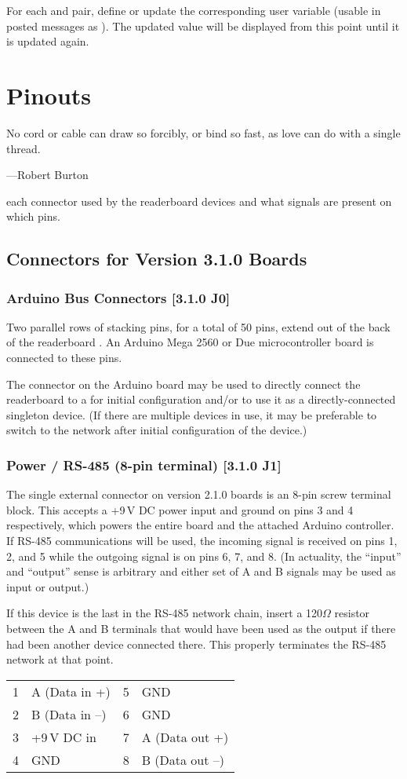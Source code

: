 For each  and  pair, define or update the corresponding
user variable (usable in posted messages as \z{\{\$}\z{\}}). The
updated value will be displayed from this point until it is updated again.

\chapter{Pinouts}
\epigraph{No cord or cable can draw so forcibly, or bind so fast, as love can do with a single thread.}{---Robert Burton}
 each connector used by the readerboard devices and what signals are present
on which pins.

\section{Connectors for Version 3.1.0 Boards}
\subsection{Arduino Bus Connectors [3.1.0 J0]}
Two parallel rows of stacking pins, for a total of 50 pins, extend out of the back of the readerboard .
An Arduino Mega 2560 or Due microcontroller board is connected to these pins.

The  connector on the Arduino board may be used to directly connect the readerboard to a 
for initial configuration and/or to use it as a directly-connected singleton device. (If there are multiple
devices in use, it may be preferable to switch to the  network after initial configuration of the
device.)

\subsection{Power / RS-485 (8-pin terminal) [3.1.0 J1]}
The single external connector on version 2.1.0 boards is an 8-pin screw terminal block. This accepts a +9\,V DC power input
and ground on pins 3 and 4 respectively, which powers the entire board and the attached Arduino controller.  If RS-485
communications will be used, the incoming signal is received on pins 1, 2, and 5 while the outgoing signal is on
pins 6, 7, and 8. (In actuality, the ``input'' and ``output'' sense is arbitrary and either set of A and B signals
may be used as input or output.) 

If this device is the last in the RS-485 network chain, insert a 120$\Omega$ resistor between the A and B terminals
that would have been used as the output if there had been another device connected there. This properly terminates
the RS-485 network at that point.
\begin{center}
	\begin{tabular}{rl|rl}
		1&A (Data in +)    &5&GND\\
		2&B (Data in --)   &6&GND\\
		3&+9\,V DC in      &7&A (Data out +)\\
		4&GND              &8&B (Data out --)\\
	\end{tabular}
\end{center}

